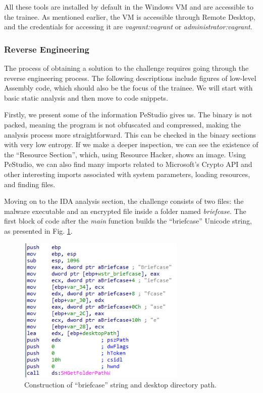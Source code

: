 All these tools are installed by default in the Windows VM and are accessible to the trainee. As mentioned earlier, the VM is accessible through Remote Desktop, and the credentials for accessing it are \textit{vagrant:vagrant} or \textit{administrator:vagrant}.

\subsubsection{Reverse Engineering} \label{sec:validation_ransomware_solution}

The process of obtaining a solution to the challenge requires going through the reverse engineering process. The following descriptions include figures of low-level Assembly code, which should also be the focus of the trainee. We will start with basic static analysis and then move to code snippets.

Firstly, we present some of the information PeStudio gives us. The binary is not packed, meaning the program is not obfuscated and compressed, making the analysis process more straightforward. This can be checked in the binary sections with very low entropy. If we make a deeper inspection, we can see the existence of the ``Resource Section'', which, using Resource Hacker, shows an image. Using PeStudio, we can also find many imports related to Microsoft's Crypto API and other interesting imports associated with system parameters, loading resources, and finding files.

Moving on to the IDA analysis section, the challenge consists of two files: the malware executable and an encrypted file inside a folder named \textit{briefcase}. The first block of code after the \textit{main} function builds the ``briefcase'' Unicode string, as presented in Fig. \ref{fig:ida_1}. 

\begin{figure}[H]
    \includegraphics[width=8cm]{figures/ida_1.png}
    \caption{Construction of ``briefcase'' string and desktop directory path.}
    \label{fig:ida_1}
\end{figure}


